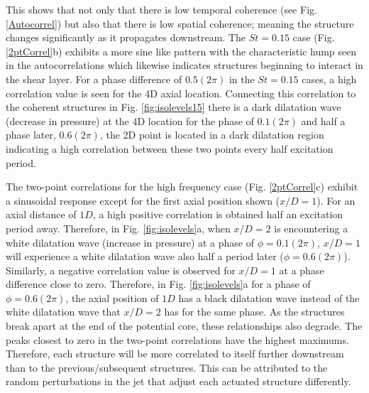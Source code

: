 \documentclass[english]{aiaa-tc}
\begin{document}
This shows that not only that there is low temporal coherence (see Fig. \ref{Autocorrel}) but also that there is low spatial coherence; meaning the structure changes significantly as it propagates downstream. 
The $St=0.15$ case (Fig. \ref{2ptCorrel}b) exhibits a more sine like pattern with the characteristic hump seen in the autocorrelations which likewise indicates structures beginning to interact in the shear layer.
 For a phase difference of $0.5(2\pi)$ in the $St=0.15$ cases, a high correlation value is seen for the 4D axial location. Connecting this correlation to the coherent structures in Fig. \ref{fig:isolevels15} there is a dark dilatation wave (decrease in pressure) at the 4D location for the phase of $0.1(2\pi)$ and half a phase later, $0.6(2\pi)$, the 2D point is located in a dark dilatation region indicating a high correlation between these two points every half excitation period.  

The two-point correlations for the high frequency case (Fig. \ref{2ptCorrel}c) exhibit a sinusoidal response except for the first axial position shown ($x/D=1$). For an axial distance of $1D$, a high positive correlation is obtained half an excitation period away. 
Therefore, in Fig. \ref{fig:isolevels}a, when $x/D=2$ is encountering a white dilatation wave (increase in pressure) at a phase of $\phi=0.1(2\pi)$, $x/D=1$ will experience a white dilatation wave also half a period later ($\phi=0.6(2\pi)$). Similarly, a negative correlation value is observed for $x/D=1$ at a phase difference close to zero. Therefore, in Fig. \ref{fig:isolevels}a for a phase of $\phi=0.6(2\pi)$, the axial position of $1D$ has a black dilatation wave instead of the white dilatation wave that $x/D=2$ has for the same phase. As the structures break apart at the end of the potential core, these relationships also degrade. 
The peaks closest to zero in the two-point correlations have the highest maximums. Therefore, each structure will be more correlated to itself further downstream than to the previous/subsequent structures. This can be attributed to the random perturbations in the jet that adjust each actuated structure differently.
\end{document}
